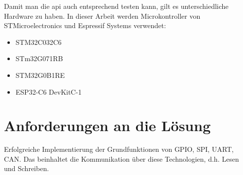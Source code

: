 Damit man die \gls{api} auch entsprechend testen kann, gilt es unterschiedliche Hardware zu haben.
In dieser Arbeit werden Microkontroller von STMicroelectronics und Espressif Systems verwendet:

\begin{itemize}
	\item STM32C032C6
	\item STm32G071RB
	\item STM32G0B1RE
	\item ESP32-C6 DevKitC-1
\end{itemize}


\section{Anforderungen an die Lösung}
Erfolgreiche Implementierung der Grundfunktionen von GPIO, SPI, UART, CAN. 
Das beinhaltet die Kommunikation über diese Technologien, d.h. Lesen und Schreiben.


